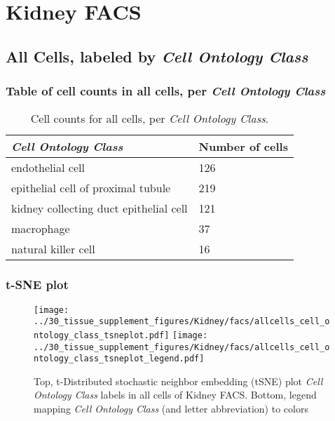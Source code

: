 \clearpage
\section{Kidney FACS}

\subsection{All Cells, labeled by \emph{Cell Ontology Class}}
\subsubsection{Table of cell counts in all cells, per \emph{Cell Ontology Class}}\begin{table}[h]
\centering
\label{my-label}
\begin{tabular}{@{}ll@{}}
\toprule

\emph{Cell Ontology Class}& Number of cells \\ \midrule
endothelial cell & 126 \\

epithelial cell of proximal tubule & 219 \\

kidney collecting duct epithelial cell & 121 \\

macrophage & 37 \\

natural killer cell & 16 \\
\bottomrule
\end{tabular}
\caption{Cell counts for all cells, per \emph{Cell Ontology Class}.}
\end{table}

\clearpage
\subsubsection{t-SNE plot}
\begin{figure}[h]
\centering
\texttt{[image: ../30\_tissue\_supplement\_figures/Kidney/facs/allcells\_cell\_ontology\_class\_tsneplot.pdf]}
\texttt{[image: ../30\_tissue\_supplement\_figures/Kidney/facs/allcells\_cell\_ontology\_class\_tsneplot\_legend.pdf]}
\caption{Top, t-Distributed stochastic neighbor embedding (tSNE) plot  \emph{Cell Ontology Class} labels in all cells of Kidney FACS. Bottom, legend mapping \emph{Cell Ontology Class} (and letter abbreviation) to colors}
\end{figure}


\clearpage

